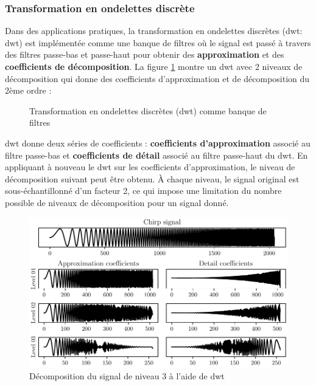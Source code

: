 \subsubsection{Transformation en ondelettes discrète}

Dans des applications pratiques, la transformation en ondelettes discrètes (\acrlong{dwt}: \acrshort{dwt}) est implémentée comme une banque de filtres où le signal est passé à travers des filtres passe-bas et passe-haut pour obtenir des \textbf{approximation} et des \textbf{coefficients de décomposition}. La figure \ref{fig:dwt} montre un \acrshort{dwt} avec 2 niveaux de décomposition qui donne des coefficients d'approximation et de décomposition du 2ème ordre :

\begin{figure}[H]
    \centering
    
    \caption{Transformation en ondelettes discrètes (\acrshort{dwt}) comme banque de filtres}
    \label{fig:dwt}
\end{figure}

\acrshort{dwt} donne deux séries de coefficients : \textbf{coefficients d'approximation} associé au filtre passe-bas et \textbf{coefficients de détail} associé au filtre passe-haut du \acrshort{dwt}. En appliquant à nouveau le \acrshort{dwt} sur les coefficients d'approximation, le niveau de décomposition suivant peut être obtenu. À chaque niveau, le signal original est sous-échantillonné d'un facteur 2, ce qui impose une limitation du nombre possible de niveaux de décomposition pour un signal donné.

\begin{figure}[h]
    \centering
    \includegraphics{figures/dwt_chirp.pdf}
    \caption{Décomposition du signal de niveau 3 à l'aide de \acrshort{dwt}}
    \label{fig:dwt-chirp-signal}
\end{figure}



